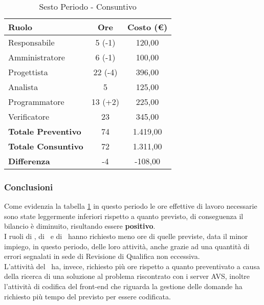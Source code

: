 \documentclass[../PianoDiProgetto_v4.0.0.tex]{subfiles}
\begin{document}
		\begin{table}[h]
				\centering
				\begin{tabular}{l * {2}{c}}
					\toprule
					\textbf{Ruolo} & \textbf{Ore} & \textbf{Costo (\euro{})} \\
					\midrule
					Responsabile & 5 (-1) & 120,00 \\

					Amministratore & 6 (-1) & 100,00 \\

					Progettista & 22 (-4) & 396,00 \\

					Analista & 5 & 125,00 \\		

					Programmatore & 13 (+2) & 225,00 \\		

					Verificatore & 23 & 345,00 \\				
					\midrule		
					\textbf{Totale Preventivo} & 74 & 1.419,00 \\
					\textbf{Totale Consuntivo} & 72  & 1.311,00 \\
					\midrule
					\textbf{Differenza} & -4  & -108,00 \\
					\bottomrule
				\end{tabular}
				\caption{Sesto Periodo - Consuntivo}
				\label{tab:consuntivo6}	
			\end{table}
		
		\subsubsection{Conclusioni}
		Come evidenzia la tabella \ref{tab:consuntivo6} in questo periodo le ore effettive di lavoro necessarie sono state leggermente inferiori rispetto a quanto previsto, di conseguenza il  bilancio è diminuito, risultando essere \textbf{positivo}.\\
		I ruoli di \responsabilediprogetto, di \amministratore\ e di \progettista\ hanno richiesto meno ore di quelle previste, data il minor impiego, in questo periodo, delle loro attività, anche grazie ad una quantità di errori segnalati in sede di Revisione di Qualifica non eccessiva.\\
		L'attività del \programmatore\ ha, invece, richiesto più ore rispetto a quanto preventivato a causa della ricerca di una soluzione al problema riscontrato con i server AVS, inoltre l'attività di codifica del front-end che riguarda la gestione delle domande ha richiesto più tempo del previsto per essere codificata.\\
		\newpage
\end{document}
